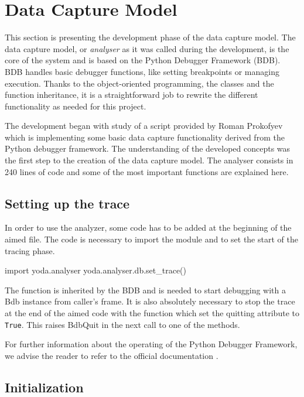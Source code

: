 \section{Data Capture Model}
This section is presenting the development phase of the data capture model. The data capture model, or \textit{analyser} as it was called during the development, is the core of the system and is based on the Python Debugger Framework (BDB). BDB handles basic debugger functions, like setting breakpoints or managing execution. Thanks to the object-oriented programming, the classes and the function inheritance, it is a straightforward job to rewrite the different functionality as needed for this project. 

The development began with study of a script provided by Roman Prokofyev which is implementing some basic data capture functionality derived from the Python debugger framework. The understanding of the developed concepts was the first step to the creation of the data capture model. The analyser consists in 240 lines of code and some of the most important functions are explained here.

\subsection{Setting up the trace}
In order to use the analyzer, some code has to be added at the beginning of the aimed file. The code is necessary to import the module and to set the start of the tracing phase. 
\begin{python}
import yoda.analyser
yoda.analyser.db.set_trace()
\end{python}

The  function is inherited by the BDB and is needed to start debugging with a Bdb instance from caller’s frame.
It is also absolutely necessary to stop the trace at the end of the aimed code with the  function which set the quitting attribute to \texttt{True}. This raises BdbQuit in the next call to one of the  methods. 

For further information about the operating of the Python Debugger Framework, we advise the reader to refer to the official documentation \citep{Foundation2017}.

\subsection{Initialization}

